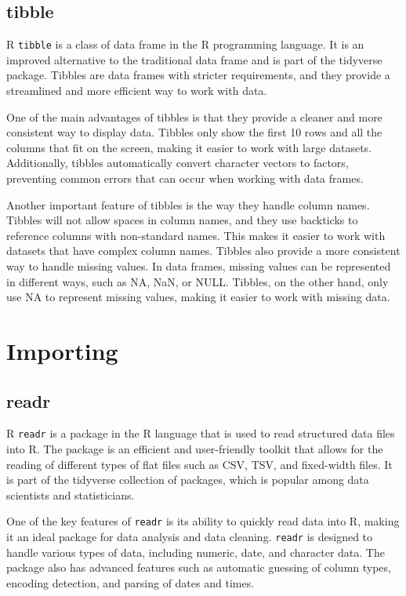 \documentclass[
]{book}
\begin{document}
\hypertarget{tibble}{%
\subsection{tibble}\label{tibble}}

R \texttt{tibble} is a class of data frame in the R programming language. It is an improved alternative to the traditional data frame and is part of the tidyverse package. Tibbles are data frames with stricter requirements, and they provide a streamlined and more efficient way to work with data.

One of the main advantages of tibbles is that they provide a cleaner and more consistent way to display data. Tibbles only show the first 10 rows and all the columns that fit on the screen, making it easier to work with large datasets. Additionally, tibbles automatically convert character vectors to factors, preventing common errors that can occur when working with data frames.

Another important feature of tibbles is the way they handle column names. Tibbles will not allow spaces in column names, and they use backticks to reference columns with non-standard names. This makes it easier to work with datasets that have complex column names. Tibbles also provide a more consistent way to handle missing values. In data frames, missing values can be represented in different ways, such as NA, NaN, or NULL. Tibbles, on the other hand, only use NA to represent missing values, making it easier to work with missing data.

\hypertarget{importing}{%
\section{Importing}\label{importing}}

\hypertarget{readr}{%
\subsection{readr}\label{readr}}

R \texttt{readr} is a package in the R language that is used to read structured data files into R. The package is an efficient and user-friendly toolkit that allows for the reading of different types of flat files such as CSV, TSV, and fixed-width files. It is part of the tidyverse collection of packages, which is popular among data scientists and statisticians.

One of the key features of \texttt{readr} is its ability to quickly read data into R, making it an ideal package for data analysis and data cleaning. \texttt{readr} is designed to handle various types of data, including numeric, date, and character data. The package also has advanced features such as automatic guessing of column types, encoding detection, and parsing of dates and times.
\end{document}
